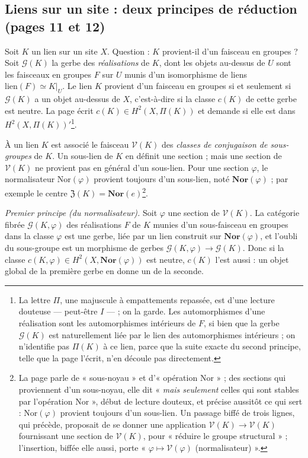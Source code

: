 \documentclass[11pt,a4paper]{article}
\begin{document}
\subsection*{Liens sur un site : deux principes de réduction (pages 11 et 12)}

Soit $K$ un lien sur un site $X$. Question : $K$ provient-il d'un faisceau en
groupes ? Soit $\mathcal{G}(K)$ la gerbe des \emph{réalisations} de $K$, dont
les objets au-dessus de $U$ sont les faisceaux en groupes $F$ sur $U$ munis d'un
isomorphisme de liens $\mathrm{lien}(F) \simeq K|_U$. Le lien $K$ provient d'un
faisceau en groupes si et seulement si $\mathcal{G}(K)$ a un objet au-dessus de
$X$, c'est-à-dire si la classe $c(K)$ de cette gerbe est neutre. La page écrit
$c(K) \in H^2(X,\Pi(K))$ et demande si elle est dans
$H^2(X,\Pi(K))'$\footnote{La lettre $\Pi$, une majuscule à empattements
repassée, est d'une lecture douteuse — peut-être $I$ — ; on la garde. Les automorphismes d'une réalisation sont les automorphismes
intérieurs de $F$, si bien que la gerbe $\mathcal{G}(K)$ est naturellement liée
par le lien des automorphismes intérieurs ; on n'identifie pas $\Pi(K)$ à ce
lien, parce que la suite exacte du second principe, telle que la page l'écrit,
n'en découle pas directement.}.

À un lien $K$ est associé le faisceau $\mathcal{V}(K)$ des \emph{classes de
conjugaison de sous-groupes} de $K$. Un sous-lien de $K$ en définit une
section ; mais une section de $\mathcal{V}(K)$ ne provient pas en général d'un
sous-lien. Pour une section $\varphi$, le normalisateur $\mathrm{Nor}(\varphi)$
provient toujours d'un sous-lien, noté $\mathbf{Nor}(\varphi)$ ; par exemple le
centre $\mathfrak{Z}(K) = \mathbf{Nor}(e)$\footnote{La page parle de « sous-noyau »
et d'« opération $\mathrm{Nor}$ » ; des sections qui proviennent d'un sous-noyau,
elle dit « \emph{mais seulement} celles qui sont stables par l'opération
$\mathrm{Nor}$ », début de lecture douteux, et précise aussitôt ce qui sert :
$\mathrm{Nor}(\varphi)$ provient toujours d'un sous-lien. Un passage biffé de
trois lignes, qui précède, proposait de se donner une application
$\mathcal{V}(K) \to \mathcal{V}(K)$ fournissant une section de $\mathcal{V}(K)$,
pour « réduire le groupe structural » ; l'insertion, biffée elle aussi, porte
« $\varphi \mapsto \mathcal{V}(\varphi)$ (normalisateur) ».}.

\emph{Premier principe (du normalisateur).} Soit $\varphi$ une section de
$\mathcal{V}(K)$. La catégorie fibrée $\mathcal{G}(K,\varphi)$ des réalisations
$F$ de $K$ munies d'un sous-faisceau en groupes dans la classe $\varphi$ est une
gerbe, liée par un lien construit sur $\mathbf{Nor}(\varphi)$, et l'oubli du
sous-groupe est un morphisme de gerbes $\mathcal{G}(K,\varphi) \to
\mathcal{G}(K)$. Donc si la classe $c(K,\varphi) \in
H^2(X,\mathbf{Nor}(\varphi))$ est neutre, $c(K)$ l'est aussi : un objet global de
la première gerbe en donne un de la seconde.
\end{document}
